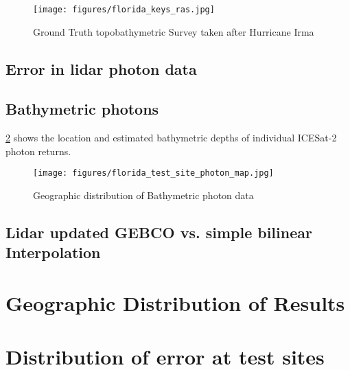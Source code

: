 \begin{figure}[h!]
    \centering
    \texttt{[image: figures/florida\_keys\_ras.jpg]}
    \caption{Ground Truth topobathymetric Survey taken after Hurricane Irma}
    \label{fig:truebathy}
\end{figure}
\subsection{Error in lidar photon data}





\subsection{Bathymetric photons}
\ref{fig:bathyphotonmap} shows the location and estimated bathymetric depths of individual ICESat-2 photon returns.
\begin{figure}[h!]
    \centering
    \texttt{[image: figures/florida\_test\_site\_photon\_map.jpg]}
    \caption{Geographic distribution of Bathymetric photon data}
    \label{fig:bathyphotonmap}
\end{figure}

\subsection{Lidar updated GEBCO vs. simple bilinear Interpolation}


\section{Geographic Distribution of Results}
\section{Distribution of error at test sites}